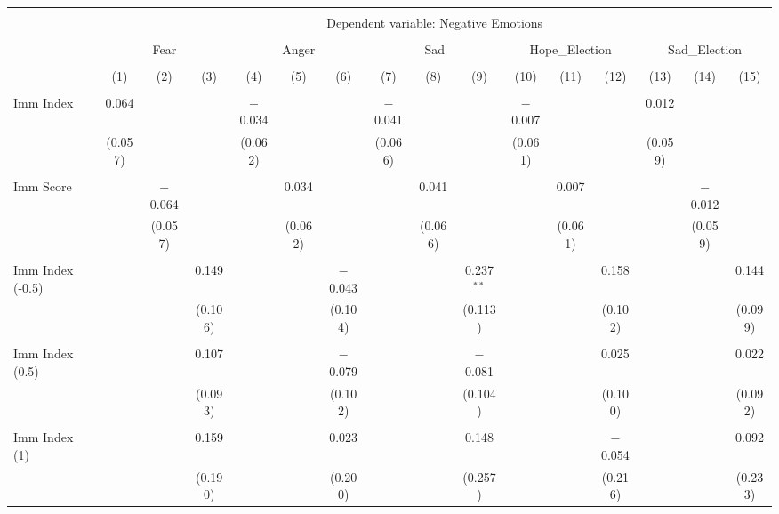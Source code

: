 
\begin{table}[!htbp] \centering 
  \caption{} 
  \label{} 
\begin{tabular}{@{\extracolsep{5pt}}lccccccccccccccc} 
\\[-1.8ex]\hline 
\hline \\[-1.8ex] 
 & \multicolumn{15}{c}{Dependent variable: Negative Emotions} \\ 
\cline{2-16} 
\\[-1.8ex] & \multicolumn{3}{c}{Fear} & \multicolumn{3}{c}{Anger} & \multicolumn{3}{c}{Sad} & \multicolumn{3}{c}{Hope\_Election} & \multicolumn{3}{c}{Sad\_Election} \\ 
\\[-1.8ex] & (1) & (2) & (3) & (4) & (5) & (6) & (7) & (8) & (9) & (10) & (11) & (12) & (13) & (14) & (15)\\ 
\hline \\[-1.8ex] 
 Imm Index & 0.064 &  &  & $-$0.034 &  &  & $-$0.041 &  &  & $-$0.007 &  &  & 0.012 &  &  \\ 
  & (0.057) &  &  & (0.062) &  &  & (0.066) &  &  & (0.061) &  &  & (0.059) &  &  \\ 
  & & & & & & & & & & & & & & & \\ 
 Imm Score &  & $-$0.064 &  &  & 0.034 &  &  & 0.041 &  &  & 0.007 &  &  & $-$0.012 &  \\ 
  &  & (0.057) &  &  & (0.062) &  &  & (0.066) &  &  & (0.061) &  &  & (0.059) &  \\ 
  & & & & & & & & & & & & & & & \\ 
 Imm Index (-0.5) &  &  & 0.149 &  &  & $-$0.043 &  &  & 0.237$^{**}$ &  &  & 0.158 &  &  & 0.144 \\ 
  &  &  & (0.106) &  &  & (0.104) &  &  & (0.113) &  &  & (0.102) &  &  & (0.099) \\ 
  & & & & & & & & & & & & & & & \\ 
 Imm Index (0.5) &  &  & 0.107 &  &  & $-$0.079 &  &  & $-$0.081 &  &  & 0.025 &  &  & 0.022 \\ 
  &  &  & (0.093) &  &  & (0.102) &  &  & (0.104) &  &  & (0.100) &  &  & (0.092) \\ 
  & & & & & & & & & & & & & & & \\ 
 Imm Index (1) &  &  & 0.159 &  &  & 0.023 &  &  & 0.148 &  &  & $-$0.054 &  &  & 0.092 \\ 
  &  &  & (0.190) &  &  & (0.200) &  &  & (0.257) &  &  & (0.216) &  &  & (0.233) \\ 

\end{tabular}
\end{table}

